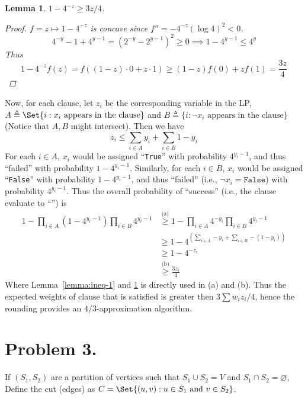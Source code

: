 \documentclass[12pt, a4paper]{article}
\newtheorem{lemma}{Lemma}
\newcommand{\defeq}{\triangleq}
\begin{document}
\begin{lemma}\label{lemma:ineq-2}
  $1 - 4^{-z} \geq 3 z / 4$.
  \begin{proof}
    $f = z \mapsto 1 - 4^{-z}$ is concave since $f'' = - 4^{-z} (\log 4)^2 < 0$.
    \[ 4^{-y} - 1 + 4^{y-1} = (2^{-y} - 2^{y-1})^2 \geq 0 \implies 1 - 4^{y-1} \leq 4^y \]
    Thus
    \[ 1 - 4^{-z} f(z) = f((1-z) \cdot 0 + z \cdot 1) \geq (1 - z) f(0) + z f(1) = \frac{3z}{4} \]
  \end{proof}
\end{lemma}

Now, for each clause, let $z_i$ be the corresponding variable in the LP,
$A \defeq \Set{ i: x_i \text{ appears} \allowbreak \text{ in the clause}}$ and
$B \defeq \{ i: \lnot x_i \text{ appears} \allowbreak \text{ in the clause}\}$ (Notice
that $A, B$ might intersect). Then we have
\[ z_i \leq \sum_{i \in A} y_i + \sum_{i \in B} 1 - y_i \]
For each $i \in A$, $x_i$ would be assigned ``\texttt{True}'' with probability $4^{y_i-1}$,
and thus ``failed'' with probability $1 - 4^{y_i-1}$. Similarly, for each $i \in B$,
$x_i$ would be assigned ``\texttt{False}'' with probability $1 - 4^{y_i-1}$,
and thus ``failed'' (i.e., $\lnot x_i = \texttt{False}$) with probability $4^{y_i-1}$.
Thus the overall probability of ``success'' (i.e., the clause evaluate to ``'')
is
\begin{align*} 1 - \prod_{i \in A} (1 - 4^{y_i-1}) \prod_{i \in B} 4^{y_i-1}
  &\stackrel{\scriptstyle\text{(a)}}{\geq} 1 - \prod_{i \in A} 4^{-y_i} \prod_{i \in B} 4^{y_i - 1} \\
  &\geq 1 - 4^{\left( \sum_{i \in A} -y_i + \sum_{i \in B} - (1 - y_i) \right)} \\
  & \geq 1 - 4^{-z_i} \\
  &\stackrel{\scriptstyle\text{(b)}}{\geq} \frac{3z_i}{4}
\end{align*}
Where Lemma~\ref{lemma:ineq-1} and \ref{lemma:ineq-2} is directly used in (a) and (b).
Thus the expected weights of clause that is satisfied is greater then $3 \sum w_i z_i / 4$,
hence the rounding provides an $4/3$-approximation algorithm.

\section{Problem 3.}
If $(S_1, S_2)$ are a partition of vertices such that $S_1 \cup S_2 = V$ and $S_1 \cap S_2 = \varnothing$,
Define the cut (edges) as $C = \Set{ (u, v) : u \in S_1 \text{ and } v \in S_2}$.
\end{document}
